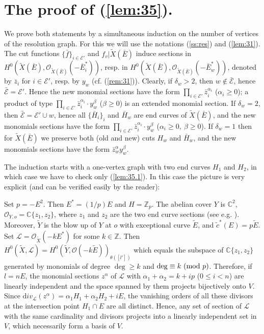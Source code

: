 \documentclass[10pt,a4paper]{amsart}
\numberwithin{equation}{section}
\numberwithin{equation}{subsection}
\theoremstyle{plain}
\theoremstyle{definition}
\begin{document}
\section{The proof of (\ref{lem:35}).}\label{s:PROOF}
We prove both statements by a simultaneous induction on the number
of vertices of the resolution graph. For this we will use the
notations (\ref{ss:res}) and (\ref{lem:31}). The cut functions
$\{\bar{f}\}_{i\in {\mathcal{E}}'}$ and $f_v|{\widetilde{X}(\bar{E})}$ induce sections in
$H^0({\widetilde{X}(\bar{E})},{\mathcal{O}}_{\widetilde{X}(\bar{E})}(-\bar{E}^*_i))$, resp. in
$H^0({\widetilde{X}(\bar{E})},{\mathcal{O}}_{\widetilde{X}(\bar{E})}(-\bar{E}^*_w))$,  denoted by $\bar{z}_i$ for
$i\in {\mathcal{E}}'$, resp. by  $y_w$ (cf. (\ref{rem:31})). Clearly, if
$\delta_w>2$, then $w\not\in \bar{\mathcal{E}}$, hence $\bar{\mathcal{E}}={\mathcal{E}}'$.
Hence the new monomial sections have the form $\prod_{i\in {\mathcal{E}}'}
\bar{z}_i^{\alpha_i}$ ($\alpha_i\geq 0$); a product of type
$\prod_{i\in {\mathcal{E}}'} \bar{z}_i^{\alpha_i}\cdot y_w^\beta$
($\beta\geq 0$) is an extended monomial section. If $\delta_w=2$,
then $\bar{\mathcal{E}}={\mathcal{E}}'\cup w$, hence all $\{\bar{H}_i\}_i$ and
$\bar{H}_w$ are end curves of ${\widetilde{X}(\bar{E})}$, and the new monomials
sections have the form $\prod_{i\in {\mathcal{E}}'}
\bar{z}_i^{\alpha_i}\cdot y_w^\beta$ ($\alpha_i\geq 0,\ \beta\geq
0$). If $\delta_w=1$ then for ${\widetilde{X}(\bar{E})}$ we preserve both (old and
new) cuts $H_w$ and $\bar{H}_w$, and the new  monomials sections
have the form $\bar{z}_w^\alpha y_w^\beta$.

\vspace{2mm}

 The induction starts with a
one-vertex graph with two end curves $H_1$ and $H_2$, in which
case we have to check only (\ref{lem:35.1}). In this case the
picture is very explicit (and can be verified easily by the
reader):

Set $p=-E^{2}$. Then $E^*=(1/p)E$ and $H={\mathbb{Z}}_p$. The abelian
cover  $Y$ is ${\mathbb{C}}^2$, ${\mathcal{O}}_{Y,o}={\mathbb{C}}\{z_1,z_2\}$, where $z_1$
and $z_2$ are the two end curve sections (see e.g.
\cite[III.5]{BPV}). Moreover, $\widetilde{Y}$ is the blow up of
$Y$ at $o$ with exceptional curve $\widetilde{E}$, and
$\widetilde{c}^*(E)=p\widetilde{E}$. Set
${\mathcal{L}}={\mathcal{O}}_{\widetilde{X}}(-kE^*)$ for some $k\in{\mathbb{Z}}$.
Then $H^0(\widetilde{X},{\mathcal{L}})
= H^0(\widetilde{Y}, {\mathcal{O}}(-k\widetilde{E}))_{\theta([l'])}$ which
equals the subspace of ${\mathbb{C}}\{z_1,z_2\}$ generated by monomials
of degree $\deg\geq k$ and $\deg \equiv k\ ({\rm mod} \ p)$.
Therefore, if $l=nE$,  the monomial sections $z^\alpha$ of
${\mathcal{L}}$  with $\alpha_1+\alpha_2=k+ip$ ($0\leq i<n$) are
linearly independent and the space spanned by them projects
bijectively onto $V$. Since ${\mathrm
div}_{\mathcal{L}}(z^\alpha)=\alpha_1H_1+\alpha_2H_2+iE$, the
vanishing orders of all these divisors at the intersection point
$H_1\cap E$ are all distinct. Hence, any set of section of
${\mathcal{L}}$ with the same cardinality and divisors projects into
a linearly independent set in $V$, which necessarily form a basis
of $V$.
\end{document}
